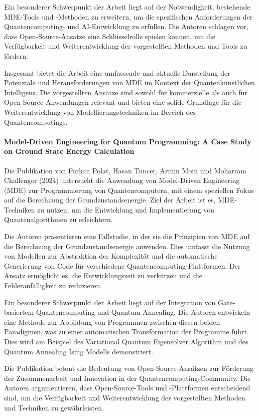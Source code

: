 Ein besonderer Schwerpunkt der Arbeit liegt auf der Notwendigkeit, bestehende MDE-Tools und -Methoden zu erweitern, 
um die spezifischen Anforderungen der Quantencomputing- und AI-Entwicklung zu erfüllen. Die Autoren schlagen vor, dass 
Open-Source-Ansätze eine Schlüsselrolle spielen können, um die Verfügbarkeit und Weiterentwicklung der vorgestellten 
Methoden und Tools zu fördern.

Insgesamt bietet die Arbeit eine umfassende und aktuelle Darstellung der Potenziale und Herausforderungen von MDE im 
Kontext der Quantenkünstlichen Intelligenz. Die vorgestellten Ansätze sind sowohl für kommerzielle als auch für 
Open-Source-Anwendungen relevant und bieten eine solide Grundlage für die Weiterentwicklung von Modellierungstechniken 
im Bereich des Quantencomputings.

\paragraph{Model-Driven Engineering for Quantum Programming: A Case Study on Ground State Energy Calculation}

Die Publikation von Furkan Polat, Hasan Tuncer, Armin Moin und Moharram Challenger (2024) \cite{Polat_2024} untersucht die Anwendung 
von Model-Driven Engineering (MDE) zur Programmierung von Quantencomputern, mit einem speziellen Fokus auf die 
Berechnung der Grundzustandsenergie. Ziel der Arbeit ist es, MDE-Techniken zu nutzen, um die Entwicklung und 
Implementierung von Quantenalgorithmen zu erleichtern.

Die Autoren präsentieren eine Fallstudie, in der sie die Prinzipien von MDE auf die Berechnung der Grundzustandsenergie 
anwenden. Dies umfasst die Nutzung von Modellen zur Abstraktion der Komplexität und die automatische Generierung von 
Code für verschiedene Quantencomputing-Plattformen. Der Ansatz ermöglicht es, die Entwicklungszeit zu verkürzen und 
die Fehleranfälligkeit zu reduzieren.

Ein besonderer Schwerpunkt der Arbeit liegt auf der Integration von Gate-basiertem Quantencomputing und Quantum 
Annealing. Die Autoren entwickeln eine Methode zur Abbildung von Programmen zwischen diesen beiden Paradigmen, was 
zu einer automatischen Transformation der Programme führt. Dies wird am Beispiel des Variational Quantum Eigensolver 
Algorithm und des Quantum Annealing Ising Modells demonstriert.

Die Publikation betont die Bedeutung von Open-Source-Ansätzen zur Förderung der Zusammenarbeit und Innovation in der 
Quantencomputing-Community. Die Autoren argumentieren, dass Open-Source-Tools und -Plattformen entscheidend sind, um 
die Verfügbarkeit und Weiterentwicklung der vorgestellten Methoden und Techniken zu gewährleisten.

